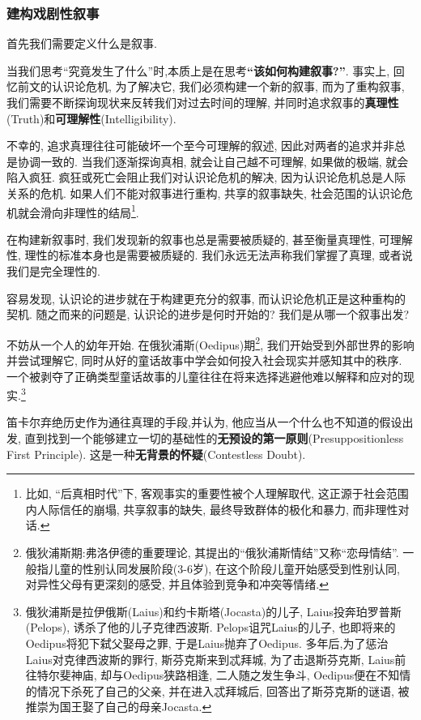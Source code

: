\documentclass[12pt, a4paper, oneside]{ctexart}
\renewcommand{\b}{\textbf}
\newcommand{\f}{\footnote}
\begin{document}
\subsubsection{建构戏剧性叙事}

首先我们需要定义什么是叙事.
    
当我们思考``究竟发生了什么''时,本质上是在思考\b{``该如何构建叙事?''}. 事实上, 回忆前文的认识论危机, 为了解决它, 我们必须构建一个新的叙事, 而为了重构叙事, 我们需要不断探询现状来反转我们对过去时间的理解, 并同时追求叙事的\b{真理性}(Truth)和\b{可理解性}(Intelligibility).

不幸的, 追求真理往往可能破坏一个至今可理解的叙述, 因此对两者的追求并非总是协调一致的. 当我们逐渐探询真相, 就会让自己越不可理解, 如果做的极端, 就会陷入疯狂. 疯狂或死亡会阻止我们对认识论危机的解决, 因为认识论危机总是人际关系的危机. 如果人们不能对叙事进行重构, 共享的叙事缺失, 社会范围的认识论危机就会滑向非理性的结局\f{比如, ``后真相时代''下, 客观事实的重要性被个人理解取代, 这正源于社会范围内人际信任的崩塌, 共享叙事的缺失, 最终导致群体的极化和暴力, 而非理性对话. }. 

在构建新叙事时, 我们发现新的叙事也总是需要被质疑的, 甚至衡量真理性, 可理解性, 理性的标准本身也是需要被质疑的. 我们永远无法声称我们掌握了真理, 或者说我们是完全理性的.

容易发现, 认识论的进步就在于构建更充分的叙事, 而认识论危机正是这种重构的契机. 随之而来的问题是, 认识论的进步是何时开始的? 我们是从哪一个叙事出发?

不妨从一个人的幼年开始. 在俄狄浦斯(Oedipus)期\f{俄狄浦斯期:弗洛伊德的重要理论, 其提出的``俄狄浦斯情结''又称``恋母情结''. 一般指儿童的性别认同发展阶段(3-6岁), 在这个阶段儿童开始感受到性别认同, 对异性父母有更深刻的感受, 并且体验到竞争和冲突等情绪. }, 我们开始受到外部世界的影响并尝试理解它, 同时从好的童话故事中学会如何投入社会现实并感知其中的秩序. 一个被剥夺了正确类型童话故事的儿童往往在将来选择逃避他难以解释和应对的现实.\f{俄狄浦斯是拉伊俄斯(Laius)和约卡斯塔(Jocasta)的儿子, Laius投奔珀罗普斯(Pelops), 诱杀了他的儿子克律西波斯. Pelops诅咒Laius的儿子, 也即将来的Oedipus将犯下弑父娶母之罪, 于是Laius抛弃了Oedipus. 多年后,为了惩治Laius对克律西波斯的罪行, 斯芬克斯来到忒拜城, 为了击退斯芬克斯, Laius前往特尔斐神庙, 却与Oedipus狭路相逢, 二人随之发生争斗, Oedipus便在不知情的情况下杀死了自己的父亲, 并在进入忒拜城后, 回答出了斯芬克斯的谜语, 被推崇为国王娶了自己的母亲Jocasta. }

笛卡尔弃绝历史作为通往真理的手段,并认为, 他应当从一个什么也不知道的假设出发, 直到找到一个能够建立一切的基础性的\b{无预设的第一原则}(Presuppositionless First Principle). 这是一种\b{无背景的怀疑}(Contestless Doubt). 
\end{document}
